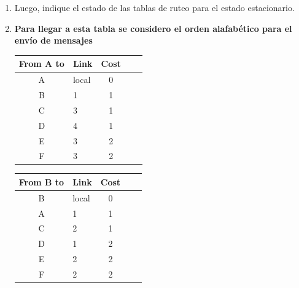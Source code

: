 \begin{enumerate}
\begin{enumerate}
        \item Luego, indique el estado de las tablas de ruteo para el estado estacionario.
        \item[] \textbf{Para llegar a esta tabla se considero el orden alafab\'etico para el env\'io de mensajes}
        \begin{table}[H]
            \begin{tabular}{@{}clcll@{}}
                \toprule
                From A to            & \multicolumn{1}{c}{Link} & Cost                 \\ \midrule
                A                    & local                    & 0                    \\
                B                    & 1                        & 1                    \\ 
                C                    & 3                        & 1                    \\
                D                    & 4                        & 1                    \\ 
                E                    & 3                        & 2                    \\ 
                F                    & 3                        & 2                    \\ \bottomrule
            \end{tabular}
            \hfill
            \begin{tabular}{@{}clcll@{}}
                \toprule
                From B to            & \multicolumn{1}{c}{Link} & Cost                 \\ \midrule
                B                    & local                    & 0                    \\ 
                A                    & 1                        & 1                    \\ 
                C                    & 2                        & 1                    \\
                D                    & 1                        & 2                    \\
                E                    & 2                        & 2                    \\
                F                    & 2                        & 2                    \\ \bottomrule
            \end{tabular}
            \hfill
            \begin{tabular}{@{}clcll@{}}

\end{tabular}
\end{table}
\end{enumerate}
\end{enumerate}
